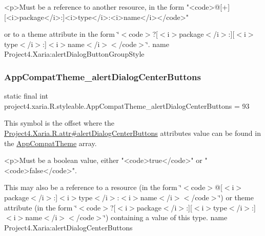 \begin{DoxyVerb}      <p>Must be a reference to another resource, in the form "<code>@[+][<i>package</i>:]<i>type</i>:<i>name</i></code>"
\end{DoxyVerb}
 or to a theme attribute in the form \char`\"{}$<$code$>$?\mbox{[}$<$i$>$package$<$/i$>$\+:\mbox{]}\mbox{[}$<$i$>$type$<$/i$>$\+:\mbox{]}$<$i$>$name$<$/i$>$$<$/code$>$\char`\"{}.  name Project4.\+Xaria\+:alert\+Dialog\+Button\+Group\+Style \mbox{\label{classproject4_1_1xaria_1_1R_1_1styleable_a5c8e6a4235c2c98dfbe58c9c3156e38a}} 
\subsubsection{\texorpdfstring{App\+Compat\+Theme\+\_\+alert\+Dialog\+Center\+Buttons}{AppCompatTheme\_alertDialogCenterButtons}}
{\footnotesize\ttfamily static final int project4.\+xaria.\+R.\+styleable.\+App\+Compat\+Theme\+\_\+alert\+Dialog\+Center\+Buttons = 93\hspace{0.3cm}{\ttfamily [static]}}

This symbol is the offset where the \hyperlink{}{Project4.\+Xaria.\+R.\+attr\#alert\+Dialog\+Center\+Buttons} attribute\textquotesingle{}s value can be found in the \hyperlink{classproject4_1_1xaria_1_1R_1_1styleable_aad8bec413e2350f9404e6ff0e831a85d}{App\+Compat\+Theme} array.

\begin{DoxyVerb}      <p>Must be a boolean value, either "<code>true</code>" or "<code>false</code>".
\end{DoxyVerb}
 

This may also be a reference to a resource (in the form \char`\"{}$<$code$>$@\mbox{[}$<$i$>$package$<$/i$>$\+:\mbox{]}$<$i$>$type$<$/i$>$\+:$<$i$>$name$<$/i$>$$<$/code$>$\char`\"{}) or theme attribute (in the form \char`\"{}$<$code$>$?\mbox{[}$<$i$>$package$<$/i$>$\+:\mbox{]}\mbox{[}$<$i$>$type$<$/i$>$\+:\mbox{]}$<$i$>$name$<$/i$>$$<$/code$>$\char`\"{}) containing a value of this type.  name Project4.\+Xaria\+:alert\+Dialog\+Center\+Buttons \mbox{\label{classproject4_1_1xaria_1_1R_1_1styleable_aad7f2a212de4bf58ca6cc476eab41d07}} 

